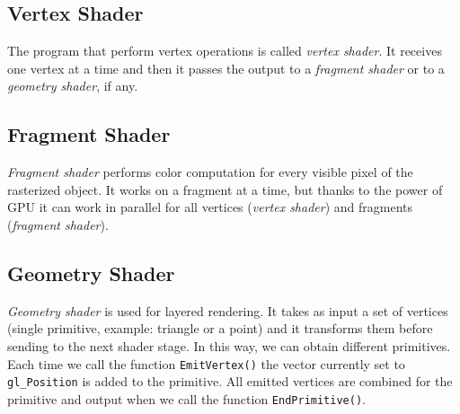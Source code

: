 
\subsection{Vertex Shader}
The program that perform vertex operations is called \textit{vertex shader}. It receives one vertex at a time and then it passes the output to a \textit{fragment shader} or to a \textit{geometry shader}, if any.

\subsection{Fragment Shader}
\textit{Fragment shader} performs color computation for every visible pixel of the rasterized object. It works on a fragment at a time, but thanks to the power of GPU it can work in parallel for all vertices (\textit{vertex shader}) and fragments (\textit{fragment shader}).

\subsection{Geometry Shader}
\textit{Geometry shader} is used for layered rendering. It takes as input a set of vertices (single primitive, example: triangle or a point) and it transforms them before sending to the next shader stage. In this way, we can obtain different primitives.
Each time we call the function \texttt{EmitVertex()} the vector currently set to \texttt{gl\_Position} is added to the primitive. All emitted vertices are combined for the primitive and output when we call the function \texttt{EndPrimitive()}.